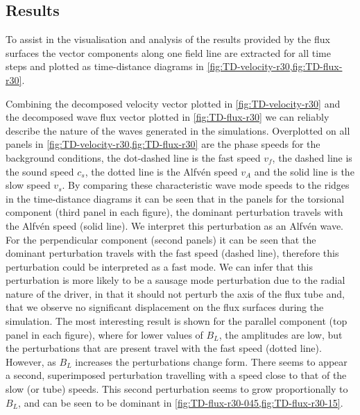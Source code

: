 \subsection{Results}\label{subsec:results}

To assist in the visualisation and analysis of the results provided by the flux surfaces the vector components along one field line are extracted for all time steps and plotted as time-distance diagrams in \cref{fig:TD-velocity-r30,fig:TD-flux-r30}.

Combining the decomposed velocity vector plotted in \cref{fig:TD-velocity-r30} and the decomposed wave flux vector plotted in \cref{fig:TD-flux-r30} we can reliably describe the nature of the waves generated in the simulations.
Overplotted on all panels in \cref{fig:TD-velocity-r30,fig:TD-flux-r30} are the phase speeds for the background conditions, the dot-dashed line is the fast speed $v_f$, the dashed line is the sound speed $c_s$, the dotted line is the Alfv\'en speed $v_A$ and the solid line is the slow speed $v_s$.
By comparing these characteristic wave mode speeds to the ridges in the time-distance diagrams it can be seen that in the panels for the torsional component (third panel in each figure), the dominant perturbation travels with the Alfv\'en speed (solid line).
We interpret this perturbation as an Alfv\'en wave.
For the perpendicular component (second panels) it can be seen that the dominant perturbation travels with the fast speed (dashed line), therefore this perturbation could be interpreted as a fast mode.
We can infer that this perturbation is more likely to be a sausage mode perturbation due to the radial nature of the driver, in that it should not perturb the axis of the flux tube and, that we observe no significant displacement on the flux surfaces during the simulation.
The most interesting result is shown for the parallel component (top panel in each figure), where for lower values of $B_L$, the amplitudes are low, but the perturbations that are present travel with the fast speed (dotted line).
However, as $B_L$ increases the perturbations change form.
There seems to appear a second, superimposed perturbation travelling with a speed close to that of the slow (or tube) speeds.
This second perturbation seems to grow proportionally to $B_L$, and can be seen to be dominant in \cref{fig:TD-flux-r30-045,fig:TD-flux-r30-15}.

